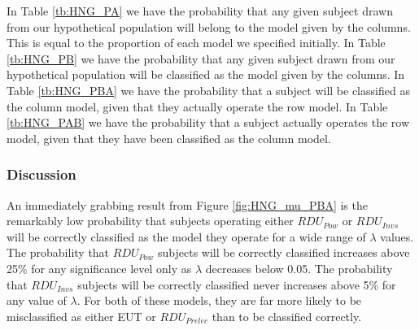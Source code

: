 \documentclass[11pt,a4paper]{report}
\begin{document}
{\begin{table}[ht!]
	\centering
	\captionsetup{justification=centering}
	\caption{$P(A | B)$}
	\label{tb:HNG_PAB}
	\begin{adjustbox}{}
	\end{adjustbox}
\end{table}
}

In Table \ref{tb:HNG_PA} we have the probability that any given subject drawn from our hypothetical population will belong to the model given by the columns.
This is equal to the proportion of each model we specified initially.
In Table \ref{tb:HNG_PB} we have the probability that any given subject drawn from our hypothetical population will be classified as the model given by the columns. 
In Table \ref{tb:HNG_PBA} we have the probability that a subject will be classified as the column model, given that they actually operate the row model.
In Table \ref{tb:HNG_PAB} we have the probability that a subject actually operates the row model, given that they have been classified as the column model.

\subsubsection{Discussion}

An immediately grabbing result from Figure \ref{fig:HNG_mu_PBA} is the remarkably low probability that subjects operating either $\mathit{RDU_{Pow}}$ or $\mathit{RDU_{Invs}}$ will be correctly classified as the model they operate for a wide range of $\lambda$ values.
The probability that $\mathit{RDU_{Pow}}$ subjects will be correctly classified increases above 25\% for any significance level only as $\lambda$ decreases below 0.05.
The probability that $\mathit{RDU_{Invs}}$ subjects will be correctly classified never increases above 5\% for any value of $\lambda$.
For both of these models, they are far more likely to be misclassified as either EUT or $\mathit{RDU_{Prelec}}$ than to be classified correctly.
\end{document}

